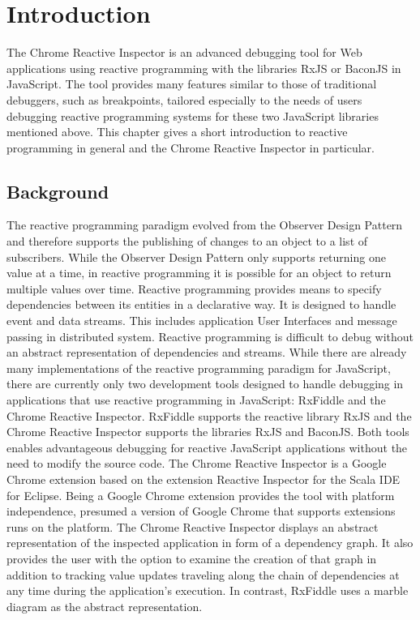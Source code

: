\chapter{Introduction} \label{ch:Introduction}
The Chrome Reactive Inspector is an advanced debugging tool for Web applications using reactive programming with the libraries RxJS or BaconJS in JavaScript. The tool provides many features similar to those of traditional debuggers, such as breakpoints, tailored especially to the needs of users debugging reactive programming systems for these two JavaScript libraries mentioned above. This chapter gives a short introduction to reactive programming in general and the Chrome Reactive Inspector in particular.

\section{Background}
The reactive programming paradigm evolved from the Observer Design Pattern and therefore supports the publishing of changes to an object to a list of subscribers. While the Observer Design Pattern only supports returning one value at a time, in reactive programming it is possible for an object to return multiple values over time. Reactive programming provides means to specify dependencies between its entities in a declarative way. It is designed to handle event and data streams. This includes application User Interfaces and message passing in distributed system. Reactive programming is difficult to debug without an abstract representation of dependencies and streams.
While there are already many implementations of the reactive programming paradigm for JavaScript, there are currently only two development tools designed to handle debugging in applications that use reactive programming in JavaScript: RxFiddle and the Chrome Reactive Inspector. RxFiddle supports the reactive library RxJS and the Chrome Reactive Inspector supports the libraries RxJS and BaconJS. Both tools enables advantageous debugging for reactive JavaScript applications without the need to modify the source code. The Chrome Reactive Inspector is a Google Chrome extension based on the extension Reactive Inspector for the Scala IDE for Eclipse. Being a Google Chrome extension provides the tool with platform independence, presumed a version of Google Chrome that supports extensions runs on the platform.
The Chrome Reactive Inspector displays an abstract representation of the inspected application in form of a dependency graph. It also provides the user with the option to examine the creation of that graph in addition to tracking value updates traveling along the chain of dependencies at any time during the application's execution. In contrast,  RxFiddle uses a marble diagram as the abstract representation.

